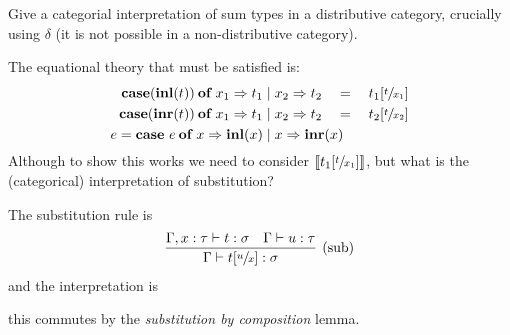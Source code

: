 \begin{exercise}
    Give a categorial interpretation of sum types in a distributive category,
    crucially using $\delta$ (it is not possible in a non-distributive
    category).
\end{exercise}

The equational theory that must be satisfied is:
\begin{align*}
    \mathbin{\text{\textbf{case}}}(\mathbin{\text{\textbf{inl}}}(t)) \mathbin{\text{\textbf{of}}} x_1 \Rightarrow t_1 &\mid x_2
    \Rightarrow t_2\quad =\quad t_1[\sfrac{t}{x_1}]
    \\
    \mathbin{\text{\textbf{case}}}(\mathbin{\text{\textbf{inr}}}(t)) \mathbin{\text{\textbf{of}}} x_1 \Rightarrow t_1 &\mid x_2
    \Rightarrow t_2\quad =\quad t_2[\sfrac{t}{x_2}]
    \\
    e = \mathbin{\text{\textbf{case}}}\ e \mathbin{\text{\textbf{of}}} x \Rightarrow \mathbin{\text{\textbf{inl}}}(x) &\mid x
    \Rightarrow \mathbin{\text{\textbf{inr}}}(x)
\end{align*}
Although to show this works we need to consider $\llbracket t_1[\sfrac{t}{x_1}]
\rrbracket$, but what is the (categorical) interpretation of substitution?

The substitution rule is
\begin{align*}
    \infer[\text{(sub)}]
    {\Gamma \vdash t[\sfrac{u}{x}] : \sigma}
    {\Gamma, x : \tau \vdash t : \sigma & \Gamma \vdash u : \tau}
\end{align*}
and the interpretation is
\begin{center}
\end{center}
this commutes by the \emph{substitution by composition} lemma.
